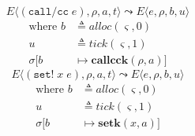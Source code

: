 \documentclass[12pt,draft]{article}
\newcommand{\callccsyn}[1]{(\texttt{call/cc}\;#1)}
\newcommand{\setsyn}[2]{(\texttt{set!}\;#1\;#2)}
\begin{document}
\begin{multicols*}{2}
\[
E\langle
\callccsyn{e} , \rho , a , t
\rangle
\leadsto
E\langle
e , \rho , b , u
\rangle
\]
\vspace{-11mm}
\begin{align*}
\text{where } b &\triangleq alloc(\varsigma, 0) \\
u &\triangleq tick(\varsigma, 1) \\
\sigma[b &\mapsto \textbf{callcck}(\rho, a)]
\end{align*}
\vspace{-5mm}
\[
E\langle
\setsyn{x}{e} , \rho , a , t
\rangle
\leadsto
E\langle
e , \rho , b , u
\rangle
\]
\vspace{-11mm}
\begin{align*}
\text{where } b &\triangleq alloc(\varsigma, 0) \\
u &\triangleq tick(\varsigma, 1) \\
\sigma[b &\mapsto \textbf{setk}(x, a)]
\end{align*}


\vfill\null
\columnbreak


\end{multicols*}
\end{document}
